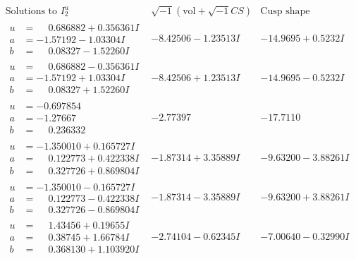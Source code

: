 \documentclass[1p]{elsarticle_modified}
\theoremstyle{definition}
\newcommand{\I}{\sqrt{-1}}
\begin{document}
$$\begin{array}{c|c|c}  
\text{Solutions to }I^u_{2}& \I (\text{vol} + \sqrt{-1}CS) & \text{Cusp shape}\\
 \hline 
\begin{aligned}
u &= \phantom{-}0.686882 + 0.356361 I \\
a &= -1.57192 - 1.03304 I \\
b &= \phantom{-}0.08327 - 1.52260 I\end{aligned}
 & -8.42506 - 1.23513 I & -14.9695 + 0.5232 I \\ \hline\begin{aligned}
u &= \phantom{-}0.686882 - 0.356361 I \\
a &= -1.57192 + 1.03304 I \\
b &= \phantom{-}0.08327 + 1.52260 I\end{aligned}
 & -8.42506 + 1.23513 I & -14.9695 - 0.5232 I \\ \hline\begin{aligned}
u &= -0.697854\phantom{ +0.000000I} \\
a &= -1.27667\phantom{ +0.000000I} \\
b &= \phantom{-}0.236332\phantom{ +0.000000I}\end{aligned}
 & -2.77397\phantom{ +0.000000I} & -17.7110\phantom{ +0.000000I} \\ \hline\begin{aligned}
u &= -1.350010 + 0.165727 I \\
a &= \phantom{-}0.122773 + 0.422338 I \\
b &= \phantom{-}0.327726 + 0.869804 I\end{aligned}
 & -1.87314 + 3.35889 I & -9.63200 - 3.88261 I \\ \hline\begin{aligned}
u &= -1.350010 - 0.165727 I \\
a &= \phantom{-}0.122773 - 0.422338 I \\
b &= \phantom{-}0.327726 - 0.869804 I\end{aligned}
 & -1.87314 - 3.35889 I & -9.63200 + 3.88261 I \\ \hline\begin{aligned}
u &= \phantom{-}1.43456 + 0.19655 I \\
a &= \phantom{-}0.38745 + 1.66784 I \\
b &= \phantom{-}0.368130 + 1.103920 I\end{aligned}
 & -2.74104 - 0.62345 I & -7.00640 - 0.32990 I \\ \hline\begin{aligned}

\end{aligned}
\end{array}$$
\end{document}
